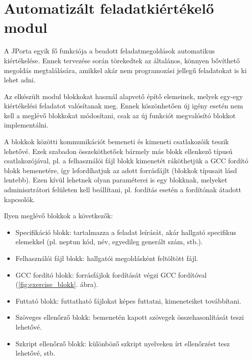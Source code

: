 \chapter{Automatizált feladatkiértékelő modul}\label{chapter:exercise}

A JPorta egyik fő funkciója a beadott feladatmegoldások automatikus kiértékelése. Ennek tervezése során törekedtek az általános, könnyen bővíthető megoldás megtalálására, amikkel akár nem programozási jellegű feladatokat is ki lehet adni. \cite{DudiMsc}

Az elkészült modul blokkokat használ alapvető építő elemeinek, melyek egy-egy kiértékelési feladatot valósítanak meg. Ennek köszönhetően új igény esetén nem kell a meglévő blokkokat módosítani, csak az új funkciót megvalósító blokkot implementálni.

A blokkok közötti kommunikációt bemeneti és kimeneti csatlakozóik teszik lehetővé. Ezek szabadon összeköthetőek bármely más blokk ellenkező típusú csatlakozójával, pl. a felhasználói fájl blokk kimenetét ráköthetjük a GCC fordító blokk bemenetére, így lefordíhatjuk az adott forrásfájlt (blokkok típusait lásd lentebb). Ezen kívül lehetnek olyan paraméterei is egy blokknak, melyeket adminisztrátori felületen kell beállítani, pl. fordítás esetén a fordítónak átadott kapcsolók.

Ilyen meglévő blokkok a következők:

\begin{itemize}
    \item Specifikáció blokk: tartalmazza a feladat leírását, akár hallgató specifikus elemekkel (pl. neptun kód, név, egyedileg generált szám, stb.). 
    \item Felhasználói fájl blokk: hallgatói megoldásként feltöltött fájl.
    \item GCC fordító blokk: forrásfájlok fordítását végzi GCC fordítóval (\ref{fig:exercise_blokk}. ábra).
    \item Futtató blokk: futtatható fájlokat képes futtatni, kimeneteiket továbbítani.
    \item Szöveges ellenőrző blokk: bemenetén kapott szövegek összehasonlítását teszi lehetővé.
    \item Szkript ellenőrző blokk: különböző szkript nyelveken írt ellenőrzést tesz lehetővé, stb.
\end{itemize} 

